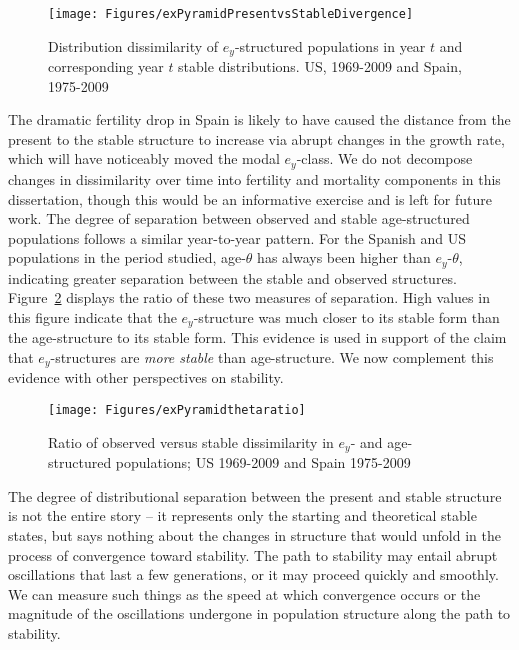 \begin{figure}[ht!]
       \centering
       \caption{Distribution dissimilarity of $e_y$-structured populations in
       year $t$ and corresponding year $t$ stable distributions. US, 1969-2009
       and Spain, 1975-2009}
        \texttt{[image: Figures/exPyramidPresentvsStableDivergence]}
        \label{fig:exstablepyr}
\end{figure}

The dramatic fertility drop in Spain is likely to have caused the distance
from the present to the stable structure to increase via abrupt changes in the
growth rate, which will have noticeably moved the modal $e_y$-class. We
do not decompose changes in dissimilarity over time into fertility and
mortality components in this dissertation, though this would be an informative
exercise and is left for future work. The degree of separation
between observed and stable age-structured populations follows a similar
year-to-year pattern. For the Spanish and US populations in the period studied,
age-$\theta$ has always been higher than $e_y$-$\theta$, indicating greater
separation between the stable and observed structures.
Figure~\ref{fig:exPyramidthetaratio} displays the ratio of these two measures 
of separation. High values in this figure indicate that the $e_y$-structure was
 much closer to its stable form than the age-structure to its stable form. This
evidence is used in support of the claim that $e_y$-structures are \textit{more
stable} than age-structure. We now complement this evidence with other
perspectives on stability.

\begin{figure}[ht!]
       \centering
       \caption{Ratio of observed versus stable dissimilarity in $e_y$- and
       age-structured populations; US 1969-2009 and Spain 1975-2009}
        \texttt{[image: Figures/exPyramidthetaratio]}
        \label{fig:exPyramidthetaratio}
\end{figure}

The degree of distributional separation between the present and stable
structure is not the entire story -- it represents only the starting and
theoretical stable states, but says nothing about the changes in structure that
would unfold in the process of convergence toward stability. The path to
stability may entail abrupt oscillations that last a few generations, or it may
proceed quickly and smoothly. We can measure such things as the speed at which
convergence occurs or the magnitude of the oscillations undergone in 
population structure along the path to stability. 

